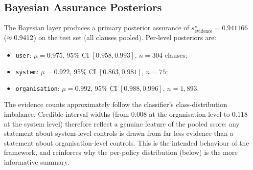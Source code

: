 \documentclass[final,3p,times,twocolumn]{elsarticle}
\def\apeqA{\SavedStyle\sim}
\def\apeq{\setstackgap{L}{\dimexpr.5pt+1.5\LMpt}\ensurestackMath{%
  \ThisStyle{\mathrel{\Centerstack{{\apeqA} {\apeqA}}}}}}
\begin{document}
	\subsection{Bayesian Assurance Posteriors}
	\label{sec:bayes-post} The Bayesian layer produces a primary posterior assurance
	of $s^\star_{\mathrm{evidence}}=0.941166$ ($\apeq0.9412$) on the test set (all clauses pooled). Per-level posteriors are:
	\begin{itemize}
		\item \texttt{user}: $\mu = 0.975$, 95\% CI $[0.958, 0.993]$, $n = 304$
			clauses;

		\item \texttt{system}: $\mu = 0.922$, 95\% CI $[0.863, 0.981]$, $n = 75$;

		\item \texttt{organisation}: $\mu = 0.992$, 95\% CI $[0.988, 0.996]$,
			$n = 1{,}893$.
	\end{itemize}
	The evidence counts approximately follow the classifier's class-distribution imbalance.
	Credible-interval widths (from $0.008$ at the organisation level to $0.118$ at
	the system level) therefore reflect a genuine feature of the pooled score: any
	statement about system-level controls is drawn from far less evidence than a statement
	about organisation-level controls. This is the intended behaviour of the
	framework, and reinforces why the per-policy distribution (below) is the more informative
	summary.
\end{document}
